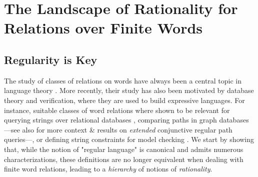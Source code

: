 \section{The Landscape of Rationality for Relations over Finite Words}
\label{sec:preliminaries-automatic-structures-relations}

\subsection{Regularity is Key}
\label{sec:preliminaries-automatic-structures-relations-landscape}

The study of classes of relations on words have always been a central topic in language theory
\cite{ElgotMezi1965RelationsGeneralizedAutomata,Nivat1968TransductionChomsky,Berstel1979Transductions,FrougnySakarovitch1993SynchronizedRationalRelations,Choffrut2006Survey}. 
More recently, their study has also been motivated by database theory and verification,
where they are used to build expressive languages. For instance,
suitable classes of word relations where shown to be relevant for querying strings over relational 
databases \cite{BenediktLibkinSchwentickSegoufin2003DefinableRelations}, comparing paths in graph databases \cite{BarceloLibkinLinWood2012ExpressiveLanguages}---see also \cite[\S 8, p.~17]{Figueira2021FoundationsGraphPathQueryLanguages}
for more context \& results on \emph{extended} conjunctive regular path queries---, or defining string constraints for model checking \cite{LinBarcelo2016StringSolvingWordEquationsTransducers}. 
We start by showing that, while the notion of "regular language" is canonical and admits 
numerous characterizations, these definitions are no longer equivalent when dealing
with finite word relations, leading to a \emph{hierarchy} of notions of \emph{rationality}.

